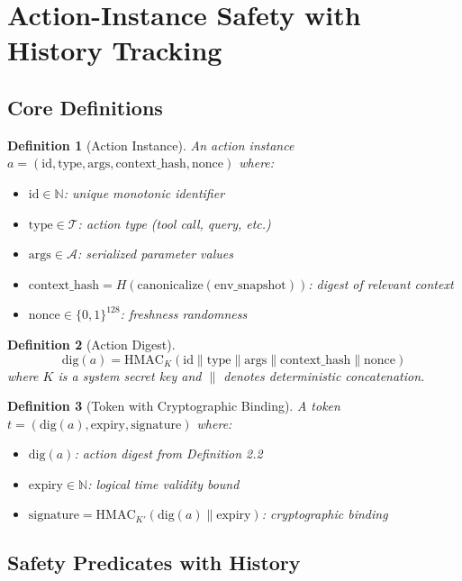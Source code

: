 \documentclass[12pt]{article}
\newtheorem{definition}{Definition}[section]
\begin{document}
\section{Action-Instance Safety with History Tracking}

\subsection{Core Definitions}

\begin{definition}[Action Instance]
An action instance $a = (\text{id}, \text{type}, \text{args}, \text{context\_hash}, \text{nonce})$ where:
\begin{itemize}
    \item $\text{id} \in \mathbb{N}$: unique monotonic identifier
    \item $\text{type} \in \mathcal{T}$: action type (tool call, query, etc.)
    \item $\text{args} \in \mathcal{A}$: serialized parameter values
    \item $\text{context\_hash} = H(\text{canonicalize}(\text{env\_snapshot}))$: digest of relevant context
    \item $\text{nonce} \in \{0,1\}^{128}$: freshness randomness
\end{itemize}
\end{definition}

\begin{definition}[Action Digest]
\[
\mathrm{dig}(a) = \mathrm{HMAC}_{K}(\text{id} \| \text{type} \| \text{args} \| \text{context\_hash} \| \text{nonce})
\]
where $K$ is a system secret key and $\|$ denotes deterministic concatenation.
\end{definition}

\begin{definition}[Token with Cryptographic Binding]
A token $t = (\mathrm{dig}(a), \text{expiry}, \text{signature})$ where:
\begin{itemize}
    \item $\mathrm{dig}(a)$: action digest from Definition 2.2
    \item $\text{expiry} \in \mathbb{N}$: logical time validity bound
    \item $\text{signature} = \mathrm{HMAC}_{K'}(\mathrm{dig}(a) \| \text{expiry})$: cryptographic binding
\end{itemize}
\end{definition}

\subsection{Safety Predicates with History}
\end{document}
